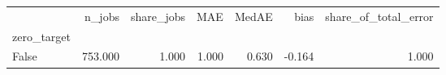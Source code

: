 \begin{tabular}{lrrrrrr}
\toprule
 & n_jobs & share_jobs & MAE & MedAE & bias & share_of_total_error \\
zero_target &  &  &  &  &  &  \\
\midrule
False & 753.000 & 1.000 & 1.000 & 0.630 & -0.164 & 1.000 \\
\bottomrule
\end{tabular}

